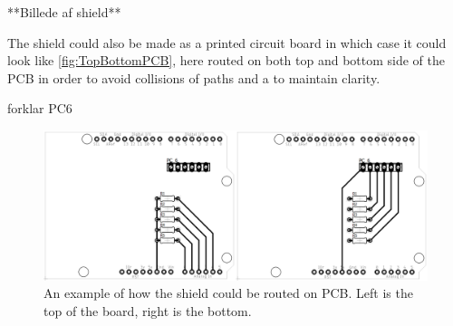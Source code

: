 **Billede af shield**

The shield could also be made as a printed circuit board in which case it could look like \autoref{fig:TopBottomPCB}, here routed on both top and bottom side of the PCB in order to avoid collisions of paths and a to maintain clarity.

forklar PC6
\begin{figure}[H]
\centering
\includegraphics[scale=0.15]{Figure/TopBottomPCB.png}
\caption{An example of how the shield could be routed on PCB. Left is the top of the board, right is the bottom.}
\label{fig:TopBottomPCB}
\end{figure}

